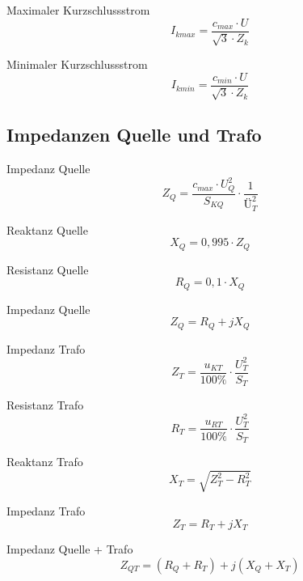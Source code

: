 \documentclass[11pt, a4paper, draft, fleqn, twocolumn]{article}
\numberwithin{equation}{subsection}
\begin{document}
\noindent Maximaler Kurzschlussstrom
\begin{equation}
    I_{kmax} = \frac{c_{max} \cdot U}{\sqrt{3} \cdot Z_k}
\end{equation}

\noindent Minimaler Kurzschlussstrom
\begin{equation}
    I_{kmin} = \frac{c_{min} \cdot U}{\sqrt{3} \cdot Z_k}
\end{equation}


\subsection{Impedanzen Quelle und Trafo}

Impedanz Quelle
\begin{equation}
    Z_Q = \frac{c_{max} \cdot U_Q^2}{S_{KQ}} \cdot \frac{1}{\text{Ü}_T^2}
\end{equation}

\noindent Reaktanz Quelle
\begin{equation}
    X_Q = 0,995 \cdot Z_Q
\end{equation}

\noindent Resistanz Quelle
\begin{equation}
    R_Q = 0,1 \cdot X_Q
\end{equation}

\noindent Impedanz Quelle
\begin{equation}
    Z_Q = R_Q + jX_Q
\end{equation}

\noindent Impedanz Trafo
\begin{equation}
    Z_T = \frac{u_{KT}}{100\%} \cdot \frac{U_T^2}{S_T}
\end{equation}

\noindent Resistanz Trafo
\begin{equation}
    R_T = \frac{u_{RT}}{100\%} \cdot \frac{U_T^2}{S_T}
\end{equation}

\noindent Reaktanz Trafo
\begin{equation}
    X_T = \sqrt{Z_T^2 - R_T^2}
\end{equation}

\noindent Impedanz Trafo
\begin{equation}
    Z_T = R_T + jX_T
\end{equation}

\noindent Impedanz Quelle + Trafo
\begin{equation}
    Z_{QT} = (R_Q + R_T) + j(X_Q + X_T)
\end{equation}
\end{document}
